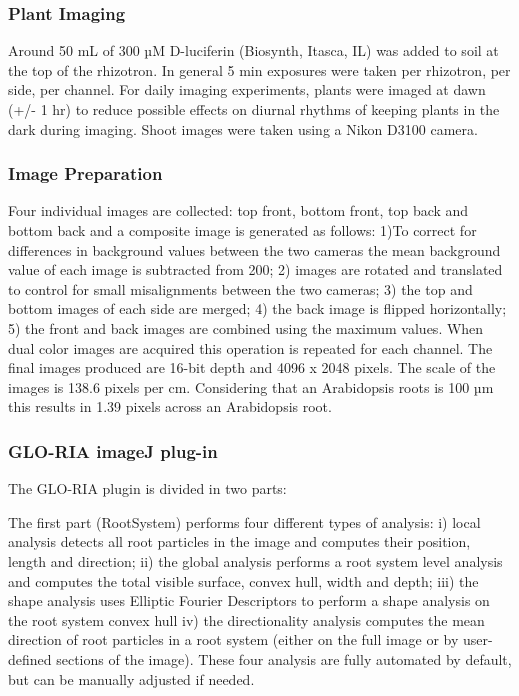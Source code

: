 \documentclass[]{article}
\begin{document}
\subsubsection{Plant Imaging}\label{plant-imaging}

Around 50 mL of 300 µM D-luciferin (Biosynth, Itasca, IL) was added to
soil at the top of the rhizotron. In general 5 min exposures were taken
per rhizotron, per side, per channel. For daily imaging experiments,
plants were imaged at dawn (+/- 1 hr) to reduce possible effects on
diurnal rhythms of keeping plants in the dark during imaging. Shoot
images were taken using a Nikon D3100 camera.

\subsubsection{Image Preparation}\label{image-preparation}

Four individual images are collected: top front, bottom front, top back
and bottom back and a composite image is generated as follows: 1)To
correct for differences in background values between the two cameras the
mean background value of each image is subtracted from 200; 2) images
are rotated and translated to control for small misalignments between
the two cameras; 3) the top and bottom images of each side are merged;
4) the back image is flipped horizontally; 5) the front and back images
are combined using the maximum values. When dual color images are
acquired this operation is repeated for each channel. The final images
produced are 16-bit depth and 4096 x 2048 pixels. The scale of the
images is 138.6 pixels per cm. Considering that an Arabidopsis roots is
100 µm this results in 1.39 pixels across an Arabidopsis root.

\subsubsection{GLO-RIA imageJ plug-in}\label{glo-ria-imagej-plug-in}

The GLO-RIA plugin is divided in two parts:

The first part (RootSystem) performs four different types of analysis:
i) local analysis detects all root particles in the image and computes
their position, length and direction; ii) the global analysis performs a
root system level analysis and computes the total visible surface,
convex hull, width and depth; iii) the shape analysis uses Elliptic
Fourier Descriptors to perform a shape analysis on the root system
convex hull iv) the directionality analysis computes the mean direction
of root particles in a root system (either on the full image or by
user-defined sections of the image). These four analysis are fully
automated by default, but can be manually adjusted if needed.
\end{document}
